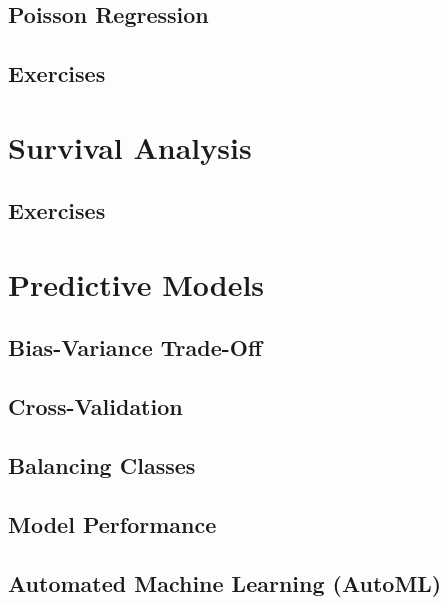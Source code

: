 \documentclass[]{book}
\begin{document}
\hypertarget{poisson-regression}{%
\section{Poisson Regression}\label{poisson-regression}}

\hypertarget{exercises-7}{%
\section{Exercises}\label{exercises-7}}

\hypertarget{surv-anal}{%
\chapter{Survival Analysis}\label{surv-anal}}

\hypertarget{exercises-8}{%
\section{Exercises}\label{exercises-8}}

\hypertarget{pred-mod}{%
\chapter{Predictive Models}\label{pred-mod}}

\hypertarget{bias-variance-trade-off}{%
\section{Bias-Variance Trade-Off}\label{bias-variance-trade-off}}

\hypertarget{cross-validation}{%
\section{Cross-Validation}\label{cross-validation}}

\hypertarget{balancing-classes}{%
\section{Balancing Classes}\label{balancing-classes}}

\hypertarget{model-performance}{%
\section{Model Performance}\label{model-performance}}

\hypertarget{automated-machine-learning-automl}{%
\section{Automated Machine Learning (AutoML)}\label{automated-machine-learning-automl}}
\end{document}
